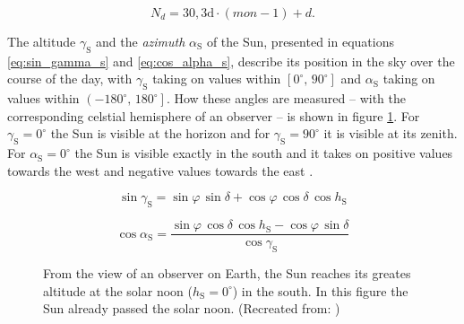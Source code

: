 \begin{center}
	\begin{equation} \label{eq:delta}
		N_d = 30,3\mathrm{d} \cdot \left(mon - 1\right) + d \text{.}
	\end{equation}
\end{center}

The altitude $\gamma_{\mathrm{S}}$ and the \emph{azimuth} $\alpha_{\mathrm{S}}$ of the Sun, presented in equations \ref{eq:sin_gamma_s} and \ref{eq:cos_alpha_s}, describe its position in the sky over the course of the day, with $\gamma_{\mathrm{S}}$ taking on values within $\left[0^\circ \text{, } 90^\circ\right]$ and $\alpha_{\mathrm{S}}$ taking on values within $\left(-180^\circ \text{, } 180^\circ \right]$. How these angles are measured -- with the corresponding celstial hemisphere of an observer -- is shown in figure \ref{fig:tikz_gamma_s_alpha_s}. For $\gamma_{\mathrm{S}} = 0^\circ$ the Sun is visible at the horizon and for $\gamma_{\mathrm{S}} = 90^\circ$ it is visible at its zenith. For $\alpha_{\mathrm{S}} = 0^\circ$ the Sun is visible exactly in the south and it takes on positive values towards the west and negative values towards the east \cite{Appelbaum:1993, Karttunen:2006, Mertens:2015, Wagner:2018}.

\begin{center}
	\begin{equation} \label{eq:sin_gamma_s}
		\sin \gamma_{\mathrm{S}} = \sin \varphi \, \sin \delta + \cos \varphi \, \cos \delta \, \cos h_{\mathrm{S}}
	\end{equation}
\end{center}

\begin{center}
	\begin{equation} \label{eq:cos_alpha_s}
		\cos \alpha_{\mathrm{S}} = \frac{\sin \varphi \, \cos \delta \, \cos h_{\mathrm{S}} - \cos \varphi \, \sin \delta}{\cos \gamma_{\mathrm{S}}}
	\end{equation}
\end{center}

\begin{figure}[h!]
	\centering
	
	\caption{From the view of an observer on Earth, the Sun reaches its greates altitude at the solar noon ($h_{\mathrm{S}} = 0^\circ$) in the south. In this figure the Sun already passed the solar noon. (Recreated from: \cite{Mertens:2015})}
	\label{fig:tikz_gamma_s_alpha_s}
\end{figure}

